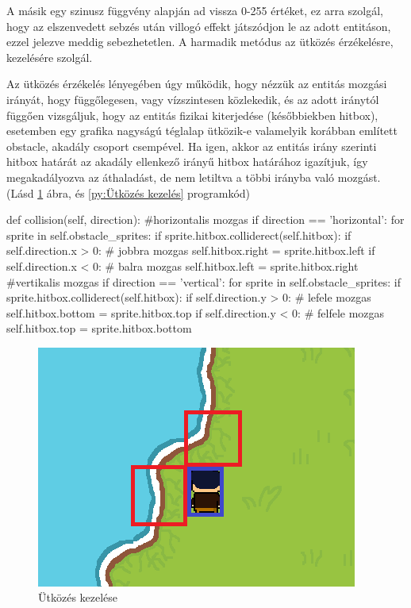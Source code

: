 A másik egy szinusz függvény alapján ad vissza 0-255 értéket, ez arra szolgál, hogy az elszenvedett sebzés után villogó effekt játszódjon le az adott entitáson, ezzel jelezve meddig sebezhetetlen. A harmadik metódus az ütközés érzékelésre, kezelésére szolgál.

Az ütközés érzékelés lényegében úgy működik, hogy nézzük az entitás mozgási irányát, hogy függőlegesen, vagy vízszintesen közlekedik, és az adott iránytól függően vizsgáljuk, hogy az entitás fizikai kiterjedése (későbbiekben hitbox), esetemben egy grafika nagyságú téglalap ütközik-e valamelyik korábban említett obstacle, akadály csoport csempével. Ha igen, akkor az entitás irány szerinti hitbox határát az akadály ellenkező irányű hitbox határához igazítjuk, így megakadályozva az áthaladást, de nem letiltva a többi irányba való mozgást. (Lásd \ref{fig:Ütközés kezelése} ábra, és \ref{py:Ütközés kezelés} programkód)




\begin{python}[caption={Ütközés kezelése},label=py:Ütközés kezelés]
def collision(self, direction):
    #horizontalis mozgas
    if direction == 'horizontal':
        for sprite in self.obstacle_sprites:
            if sprite.hitbox.colliderect(self.hitbox):
                if self.direction.x > 0:
                # jobbra mozgas
                    self.hitbox.right = sprite.hitbox.left
                if self.direction.x < 0:
                # balra mozgas
                    self.hitbox.left = sprite.hitbox.right                   
    #vertikalis mozgas
    if direction == 'vertical':
        for sprite in self.obstacle_sprites:
            if sprite.hitbox.colliderect(self.hitbox):
                    if self.direction.y > 0:
                        # lefele mozgas
                        self.hitbox.bottom = sprite.hitbox.top
                        if self.direction.y < 0:
                        # felfele mozgas
                        self.hitbox.top = sprite.hitbox.bottom
                    \end{python} 


                    \begin{figure}[H]
                        \centering
                        \includegraphics[width=15.0truecm]{images/collision.png}
                        \caption{Ütközés kezelése}
                        \label{fig:Ütközés kezelése}
                    \end{figure}
                    
